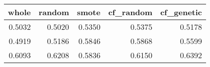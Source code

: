 \begin{tabular}{rrrrr}
\toprule

 whole &  random &  smote &  cf\_random &  cf\_genetic \\
\midrule

0.5032 &  0.5020 & 0.5350 &     0.5375 &      0.5178 \\
0.4919 &  0.5186 & 0.5846 &     0.5868 &      0.5599 \\
0.6093 &  0.6208 & 0.5836 &     0.6150 &      0.6392 \\

\bottomrule
\end{tabular}
